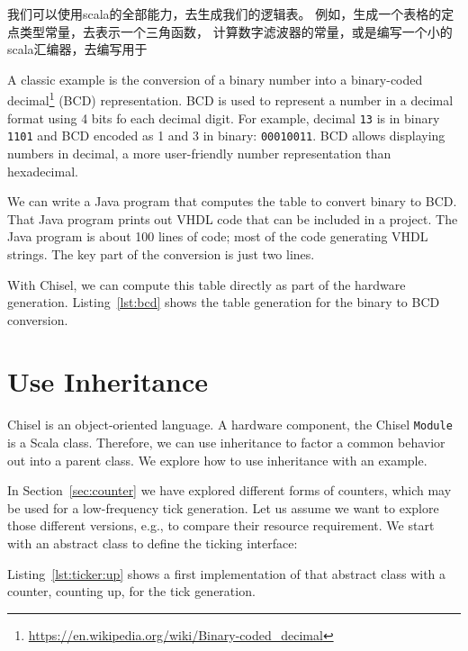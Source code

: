 \documentclass[%
    10pt,
    headinclude, footexclude,
    openright, %
    notitlepage,
    cleardoubleempty,
    headsepline,
    pointlessnumbers,
    bibtotoc, idxtotoc,
    ]{scrbook}
\newcommand{\code}[1]{{\small{\texttt{#1}}}}
\newcommand{\myref}[2]{\href{#1}{#2}}
\renewcommand{\myref}[2]{{#2}{\footnote{\url{#1}}}}
\begin{document}
{我们可以使用scala的全部能力，去生成我们的逻辑表。
例如，生成一个表格的定点类型常量，去表示一个三角函数，
计算数字滤波器的常量，或是编写一个小的scala汇编器，去编写用于

A classic example is the conversion of a binary number
into a \myref{https://en.wikipedia.org/wiki/Binary-coded_decimal}{binary-coded decimal}
(BCD) representation. BCD is used to represent a number in a decimal
format using 4 bits fo each decimal digit. For example, decimal \code{13} is in binary
\code{1101} and BCD encoded as 1 and 3 in binary: \code{00010011}.
BCD allows displaying numbers in decimal, a more user-friendly number
representation than hexadecimal.

We can write a Java program that computes the table to convert binary to BCD.
That Java program prints out VHDL code that can be included in a project.
The Java program is about 100 lines of code; most of the code generating
VHDL strings. The key part of the conversion is just two lines.

With Chisel, we can compute this table directly as part of the hardware generation.
Listing~\ref{lst:bcd} shows the table generation for the binary to BCD conversion.


\section{Use Inheritance}
\label{sec:inheritance}

Chisel is an object-oriented language. A hardware component, the Chisel \code{Module}
is a Scala class. Therefore, we can use inheritance to factor a common behavior
out into a parent class. We explore how to use inheritance with an example.

In Section~\ref{sec:counter} we have explored different forms of counters,
which may be used for a low-frequency tick generation. Let us assume we want to
explore those different versions, e.g., to compare their resource requirement.
We start with an abstract class to define the ticking interface:


\noindent Listing~\ref{lst:ticker:up} shows a first implementation of that abstract class
with a counter, counting up, for the tick generation.


}
\end{document}

